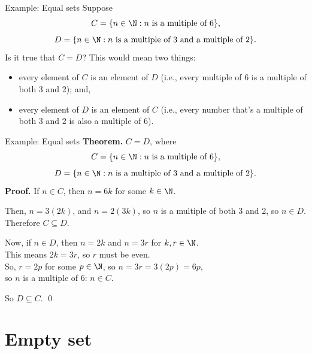 \documentclass[11pt,aspectratio=1610]{beamer}
\begin{document}
\begin{frame}{Example: Equal sets}
	Suppose $$C = \{n \in \N: n \textrm{ is a multiple of }6\},$$ \p $$D = \{n \in \N : n \textrm{ is a multiple of $3$ and a multiple of }2\}.$$  \p Is it true that $C = D$? 
	\newline\newline
	This would mean two things:\p
	\begin{itemize}
		\item every element of $C$ is an element of $D$ (i.e., every multiple of 6 is a multiple of both 3 and 2); and, \p
		\item every element of $D$ is an element of $C$ (i.e., every number that's a multiple of both 3 and 2 is also a multiple of 6). 
	\end{itemize} 
\end{frame}

\begin{frame}{Example: Equal sets}
	\textbf{Theorem.} $C = D$, where $$C = \{n \in \N: n \textrm{ is a multiple of }6\},$$ $$D = \{n \in \N : n \textrm{ is a multiple of $3$ and a multiple of }2\}.$$ \p 
	\textbf{Proof.} If $n \in C$, then $n = 6k$ for some $k \in \N$. \p 
	
	Then, $n = 3(2k)$, and $n = 2(3k)$, \p so $n$ is a multiple of both 3 and 2, \p so $n \in D$. \p Therefore $C \subseteq D$. \vspace{2mm}
	
	Now, if $n \in D$, then $n = 2k$ and $n = 3r$ for $k,r \in \N$. \p \\
	
	\vspace{2mm}
	This means $2k = 3r$, so $r$ must be even. \p \\
	
	\vspace{2mm}
	So, $r = 2p$ for some $p \in \N$, so $n = 3r = 3(2p) = 6p$, \p \\
	
	\vspace{2mm}
	so $n$ is a multiple of 6: $n \in C$. \p \\
	\vspace{2mm}
	
	So $D \subseteq C$. \qed
	
\end{frame}

\section{Empty set}
\end{document}
